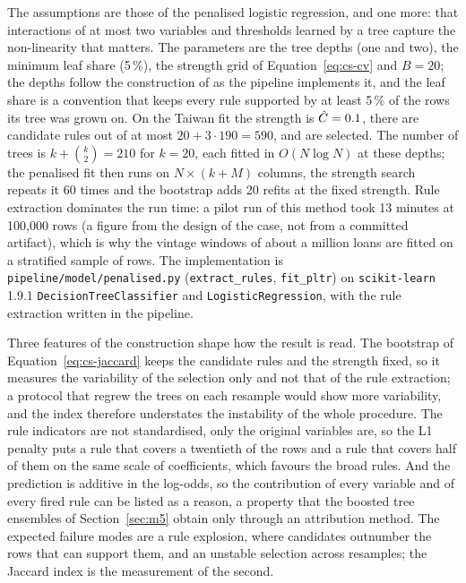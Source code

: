 The assumptions are those of the penalised logistic regression, and one more: that interactions of at most two variables and
thresholds learned by a tree capture the non-linearity that matters. The parameters are the tree depths (one and two), the
minimum leaf share (5\,\%), the strength grid of Equation~\eqref{eq:cs-cv} and $B=20$; the depths follow the construction of
\citet{credit-scoring:dumitrescu2022} as the pipeline implements it, and the leaf share is a convention that keeps every rule
supported by at least 5\,\% of the rows its tree was grown on. On the Taiwan fit the strength is $\hat C=0.1{}$, there
are \csFitTwPlCand{} candidate rules out of at most $20+3\cdot190=590$, and \csFitTwPlSel{} are selected. The number of trees is
$k+\binom{k}{2}=210$ for $k=20$, each fitted in $O(N\log N)$ at these depths; the penalised fit then runs on $N\times(k+M)$
columns, the strength search repeats it 60 times and the bootstrap adds 20 refits at the fixed strength. Rule extraction
dominates the run time: a pilot run of this method took 13 minutes at 100,000 rows (a figure from the design of the case, not from a committed artifact), which is why the
vintage windows of about a million loans are fitted on a stratified sample of \csCthreeFitRows{} rows. The implementation is
\texttt{pipeline/model/penalised.py} (\texttt{extract\_rules}, \texttt{fit\_pltr}) on \texttt{scikit-learn} 1.9.1
\texttt{DecisionTreeClassifier} and \texttt{LogisticRegression}, with the rule extraction written in the pipeline.

Three features of the construction shape how the result is read. The bootstrap of Equation~\eqref{eq:cs-jaccard} keeps the
candidate rules and the strength fixed, so it measures the variability of the selection only and not that of the rule
extraction; a protocol that regrew the trees on each resample would show more variability, and the index therefore understates the
instability of the whole procedure. The rule indicators are not standardised, only the original variables are, so the L1 penalty
puts a rule that covers a twentieth of the rows and a rule that covers half of them on the same scale of coefficients, which
favours the broad rules. And the prediction is additive in the log-odds, so the contribution of every variable and of every
fired rule can be listed as a reason, a property that the boosted tree ensembles of Section~\ref{sec:m5} obtain only through an
attribution method. The expected failure modes are a rule explosion, where candidates outnumber the rows that can support them,
and an unstable selection across resamples; the Jaccard index is the measurement of the second.

